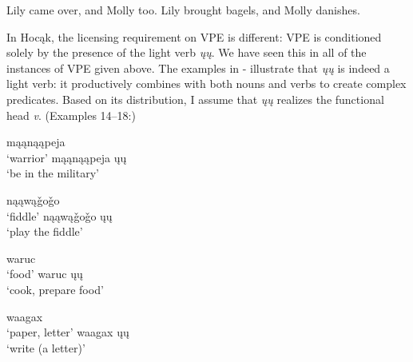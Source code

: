 \documentclass[output=paper]{LSP/langsci}
\begin{document}
\begin{exe}
\ex
\begin{xlist}
\ex
Lily came over, and Molly too.
\ex
Lily brought bagels, and Molly danishes.
\end{xlist}
\end{exe}

In Hocąk, the licensing requirement on VPE is different: VPE is conditioned solely by the presence of the light verb \emph{ųų}. We have seen this in all of the instances of VPE given above. The examples in - illustrate that \emph{ųų} is indeed a light verb: it productively combines with both nouns and verbs to create complex predicates. Based on its distribution, I assume that \emph{ųų} realizes the functional head \emph{v}. (Examples 14--18:\citealt{Hartmann2012})

\begin{exe}
\ex
\begin{multicols}{2}
\begin{xlist}
\ex
mąąnąąpeja\\
`warrior'
\ex
mąąnąąpeja ųų\\
`be in the military'
\end{xlist}
\end{multicols}
\end{exe}

\begin{exe}
\ex
\begin{multicols}{2}
\begin{xlist}
\ex
nąąwą\v{g}o\v{g}o\\
`fiddle'
\ex
nąąwą\v{g}o\v{g}o ųų\\
`play the fiddle'
\end{xlist}
\end{multicols}
\end{exe}

\begin{exe}
\ex
\begin{multicols}{2}
\begin{xlist}
\ex
waruc\\
`food'
\ex
waruc ųų\\
`cook, prepare food'
\end{xlist}
\end{multicols}
\end{exe}

\begin{exe}
\ex
\begin{multicols}{2}
\begin{xlist}
\ex
waagax\\
`paper, letter'
\ex
waagax ųų\\
`write (a letter)'
\end{xlist}
\end{multicols}
\end{exe}
\end{document}
